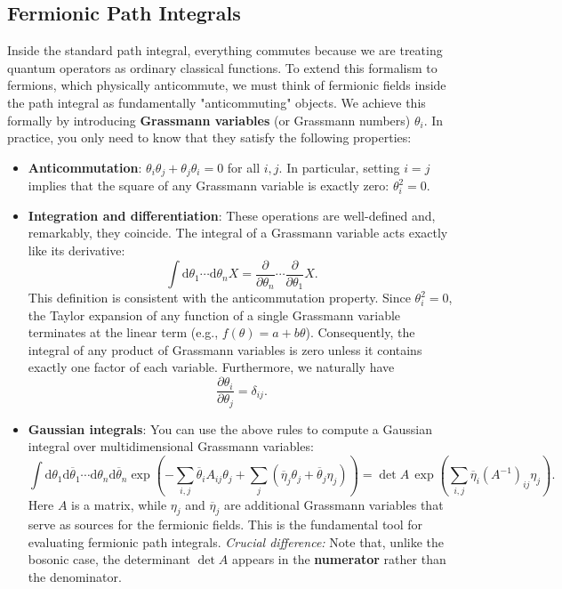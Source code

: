 \subsection{Fermionic Path Integrals} 

Inside the standard path integral, everything commutes because we are treating quantum operators as ordinary classical functions. To extend this formalism to fermions, which physically anticommute, we must think of fermionic fields inside the path integral as fundamentally "anticommuting" objects. We achieve this formally by introducing \textbf{Grassmann variables} (or Grassmann numbers) \(\theta_i\). In practice, you only need to know that they satisfy the following properties:
\begin{itemize}
    \item \textbf{Anticommutation}: \(\theta_i \theta_j + \theta_j \theta_i = 0\) for all \(i, j\). In particular, setting \(i=j\) implies that the square of any Grassmann variable is exactly zero: \(\theta_i^2 = 0\).
    \item \textbf{Integration and differentiation}: These operations are well-defined and, remarkably, they coincide. The integral of a Grassmann variable acts exactly like its derivative:
          \[
              \int \mathrm{d} \theta_1 \cdots \mathrm{d} \theta_n X = \frac{\partial}{\partial \theta_n} \cdots \frac{\partial}{\partial \theta_1} X.
          \]
          This definition is consistent with the anticommutation property. Since \(\theta_i^2 = 0\), the Taylor expansion of any function of a single Grassmann variable terminates at the linear term (e.g., \(f(\theta) = a + b\theta\)). Consequently, the integral of any product of Grassmann variables is zero unless it contains exactly one factor of each variable. Furthermore, we naturally have
          \[
              \frac{\partial \theta_i}{\partial \theta_j} = \delta_{ij}.
          \]
    \item \textbf{Gaussian integrals}: You can use the above rules to compute a Gaussian integral over multidimensional Grassmann variables:
          \[
              \int \mathrm{d} \theta_1 \mathrm{d} \overline{\theta}_1 \cdots \mathrm{d} \theta_n \mathrm{d} \overline{\theta}_n \exp\left(-\sum_{i,j} \overline{\theta}_i A_{ij} \theta_j + \sum_{j} \left(\overline{\eta}_j \theta_j + \overline{\theta}_j \eta_j\right) \right) = \det A \, \exp\left(\sum_{i,j} \overline{\eta}_i (A^{-1})_{ij} \eta_j\right).
          \]
          Here \(A\) is a matrix, while \(\eta_j\) and \(\overline{\eta}_j\) are additional Grassmann variables that serve as sources for the fermionic fields. This is the fundamental tool for evaluating fermionic path integrals. \textit{Crucial difference:} Note that, unlike the bosonic case, the determinant \(\det A\) appears in the \textbf{numerator} rather than the denominator.
\end{itemize}

